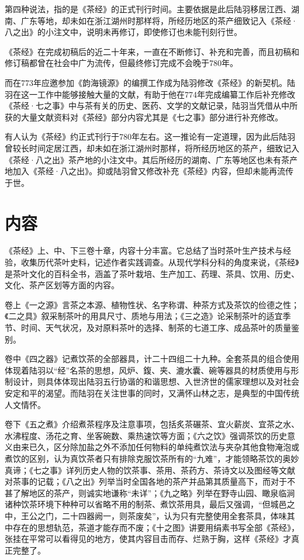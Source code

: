 \documentclass[12pt,UTF8]{ctexbook}
\begin{document}
第四种说法，指的是《茶经》的正式刊行时间。主要依据是此后陆羽移居江西、湖南、广东等地，却未如在浙江湖州时那样将，所经历地区的茶产细致记入《茶经·八之出》的小注文中，说明未再修订，即使修订也未能刊刻行世。

《茶经》在完成初稿后的近二十年来，一直在不断修订、补充和完善，而且初稿和修订稿都曾在社会中广为流传，但最终修订完成不会晚于780年。

而在773年应邀参加《韵海镜源》的编撰工作成为陆羽修改《茶经》的新契机。陆羽在这一工作中能够接触大量的文献，有助于他在774年完成编纂工作后补充修改《茶经·七之事》中与茶有关的历史、医药、文学的文献记录，陆羽当凭借从中所获的大量文献资料对《茶经》部分内容尤其是《七之事》部分进行补充修改。

有人认为《茶经》约正式刊行于780年左右。这一推论有一定道理，因为此后陆羽曾较长时间定居江西，却未如在浙江湖州时那样，将所经历地区的茶产，细致记入《茶经·八之出》茶产地的小注文中。其后所经历的湖南、广东等地区也未有茶产地加入《茶经·八之出》。抑或陆羽曾又修改补充《茶经》内容，但却未能再流传于世。

\section{内容}

《茶经》上、中、下三卷十章，内容十分丰富。它总结了当时茶叶生产技术与经验，收集历代茶叶史料，记述作者实践调查。从现代学科分科的角度来说，《茶经》是茶叶文化的百科全书，涵盖了茶叶栽培、生产加工、药理、茶具、饮用、历史、文化、茶产区划等方面的内容。

卷上《一之源》言茶之本源、植物性状、名字称谓、种茶方式及茶饮的俭德之性；《二之具》叙采制茶叶的用具尺寸、质地与用法；《三之造》论采制茶叶的适宜季节、时间、天气状况，及对原料茶叶的选择、制茶的七道工序、成品茶叶的质量鉴别。

卷中《四之器》记煮饮茶的全部器具，计二十四组二十九种。全套茶具的组合使用体现着陆羽以“经”名茶的思想，风炉、鍑、夹、漉水囊、碗等器具的材质使用与形制设计，则具体体现出陆羽五行协谐的和谐思想、入世济世的儒家理想以及对社会安定和平的渴望。而陆羽在关注世事的同时，又满怀山林之志，是典型的中国传统人文情怀。

卷下《五之煮》介绍煮茶程序及注意事项，包括炙茶碾茶、宜火薪炭、宜茶之水、水沸程度、汤花之育、坐客碗数、乘热速饮等方面；《六之饮》强调茶饮的历史意义由来已久，区分除加盐之外不添加任何物料的单纯煮饮法与夹杂其他食物淹泡或煮饮的区别，认为真饮茶者只有排除克服饮茶所有的“九难”，才能领略茶饮的奥妙真谛；《七之事》详列历史人物的饮茶事、茶用、茶药方、茶诗文以及图经等文献对茶事的记载；《八之出》列举当时全国各地的茶产并品第其质量高下，而对于不甚了解地区的茶产，则诚实地谦称“未详”；《九之略》列举在野寺山园、瞰泉临涧诸种饮茶环境下种种可以省略不用的制茶、煮饮茶用具，最后又强调，“但城邑之中，王公之门，二十四器阙一，则茶废矣”，认为只有完整使用全套茶具，体味其中存在的思想轨范，茶道才能存而不废；《十之图》讲要用绢素书写全部《茶经》，张挂在平常可以看得见的地方，使其内容目击而存、烂熟于胸，这样《茶经》才真正完整了。
\end{document}
